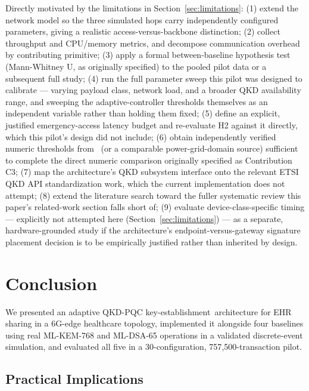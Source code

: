 \documentclass[journal]{IEEEtran}
\newcommand{\keyest}{key-establishment}
\begin{document}
Directly motivated by the limitations in Section~\ref{sec:limitations}: (1) extend the network model so the three simulated hops carry independently configured parameters, giving a realistic access-versus-backbone distinction; (2) collect throughput and CPU/memory metrics, and decompose communication overhead by contributing primitive; (3) apply a formal between-baseline hypothesis test (Mann-Whitney U, as originally specified) to the pooled pilot data or a subsequent full study; (4) run the full parameter sweep this pilot was designed to calibrate --- varying payload class, network load, and a broader QKD availability range, and sweeping the adaptive-controller thresholds themselves as an independent variable rather than holding them fixed; (5) define an explicit, justified emergency-access latency budget and re-evaluate H2 against it directly, which this pilot's design did not include; (6) obtain independently verified numeric thresholds from~\cite{zhu2025technoeconomic} (or a comparable power-grid-domain source) sufficient to complete the direct numeric comparison originally specified as Contribution C3; (7) map the architecture's QKD subsystem interface onto the relevant ETSI QKD API standardization work, which the current implementation does not attempt; (8) extend the literature search toward the fuller systematic review this paper's related-work section falls short of; (9) evaluate device-class-specific timing --- explicitly not attempted here (Section~\ref{sec:limitations}) --- as a separate, hardware-grounded study if the architecture's endpoint-versus-gateway signature placement decision is to be empirically justified rather than inherited by design.

\section{Conclusion}
\label{sec:conclusion}

We presented an adaptive QKD-PQC \keyest\ architecture for EHR sharing in a 6G-edge healthcare topology, implemented it alongside four baselines using real ML-KEM-768 and ML-DSA-65 operations in a validated discrete-event simulation, and evaluated all five in a 30-configuration, 757{,}500-transaction pilot.

\subsection{Practical Implications}
\end{document}
